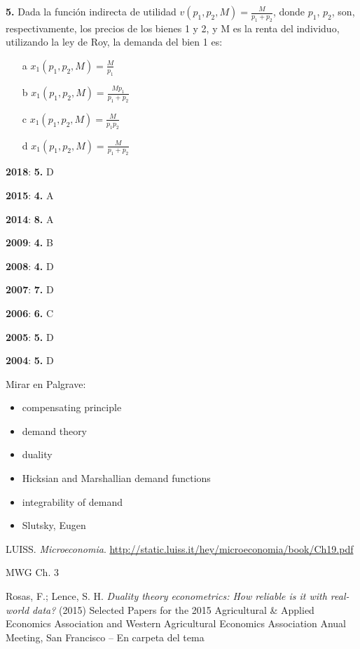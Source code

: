 \documentclass{nuevotema}
\begin{document}
\textbf{5.} Dada la función indirecta de utilidad $v(p_1, p_2, M) = \frac{M}{p_1+p_2}$, donde $p_1$, $p_2$, son, respectivamente, los precios de los bienes 1 y 2, y M es la renta del individuo, utilizando la ley de Roy, la demanda del bien 1 es:
\begin{enumerate}
	\item[a] $x_1(p_1, p_2, M) = \frac{M}{p_1}$
	\item[b] $x_1(p_1, p_2, M) = \frac{Mp_1}{p_1+p_2}$
	\item[c] $x_1(p_1, p_2, M) = \frac{M}{p_1 p_2}$
	\item[d] $x_1(p_1, p_2, M) = \frac{M}{p_1 + p_2}$
\end{enumerate}

\notas

\textbf{2018}: \textbf{5.} D

\textbf{2015}: \textbf{4.} A

\textbf{2014}: \textbf{8.} A

\textbf{2009}: \textbf{4.} B

\textbf{2008}: \textbf{4.} D

\textbf{2007}: \textbf{7.} D

\textbf{2006}: \textbf{6.} C

\textbf{2005}: \textbf{5.} D

\textbf{2004}: \textbf{5.} D


\bibliografia

Mirar en Palgrave:
\begin{itemize}
	\item compensating principle
	\item demand theory
	\item duality
	\item Hicksian and Marshallian demand functions
	\item integrability of demand
	\item Slutsky, Eugen
\end{itemize}

LUISS. \textit{Microeconomia}. \url{http://static.luiss.it/hey/microeconomia/book/Ch19.pdf}

MWG Ch. 3

Rosas, F.; Lence, S. H. \textit{Duality theory econometrics: How reliable is it with real-world data?} (2015) Selected Papers for the 2015 Agricultural \& Applied Economics Association and Western Agricultural Economics Association Anual Meeting, San Francisco -- En carpeta del tema
\end{document}
